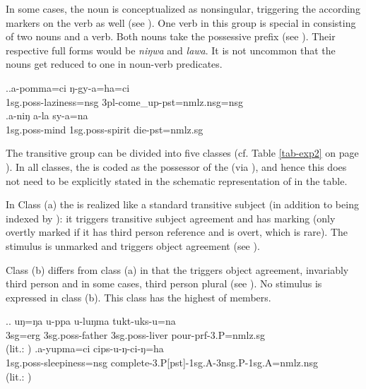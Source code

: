 In some cases, the noun is conceptualized as nonsingular, triggering  the according   markers on the verb as well (see \Next[a]). One verb in this group is special in consisting of  two nouns and a verb. Both nouns take the possessive prefix (see \Next[b]). Their respective full forms would be \emph{niŋwa} and \emph{lawa}. It is not uncommon that the nouns get reduced to one  in noun-verb predicates.

\ex.\ag.a-pomma=ci ŋ-gy-a=ha=ci\\
{\sc 1sg.poss-}laziness{\sc =nsg} {\sc 3pl-}come\_up{\sc -pst=nmlz.nsg=nsg}\\
\bg.a-niŋ a-la sy-a=na\\
{\sc 1sg.poss-}mind {\sc 1sg.poss-}spirit die{\sc [3sg]-pst=nmlz.sg}\\



The transitive group can be divided into five classes (cf. Table \ref{tab-exp2} on page \pageref{tab-exp2}). In all classes, the  is coded as the possessor of the  (via ), and hence this does not need to be explicitly stated in the schematic representation of  in the table. 

In Class (a) the  is realized like a standard transitive subject (in addition to being indexed by ): it  triggers transitive subject agreement and has   marking (only overtly marked if it has third person reference and is overt, which is rare). The stimulus is unmarked and triggers object agreement (see \Next[a]). 

Class (b) differs from class (a) in that the  triggers object agreement, invariably third person and in some cases, third person plural (see \Next[b]). No stimulus is expressed in class (b). This class has the highest  of members. 

 \ex.\ag. uŋ=ŋa   u-ppa             u-luŋma  tukt-uks-u=na\\
{\sc 3sg=erg} {\sc 3sg.poss-}father {\sc 3sg.poss-}liver pour{\sc -prf-3.P=nmlz.sg}\\
 (lit.: )
\bg.\label{ex-yupmaci}a-yupma=ci cips-u-ŋ-ci-ŋ=ha\\
 {\sc 1sg.poss-}sleepiness{\sc =nsg} complete{\sc -3.P[pst]-1sg.A-3nsg.P-1sg.A=nmlz.nsg}\\
 (lit.: )

